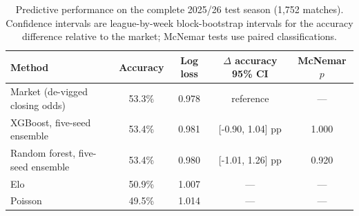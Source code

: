 \begin{table}[tbp]
\centering
\small
\setlength{\tabcolsep}{5pt}
\caption{Predictive performance on the complete 2025/26 test season (1,752 matches). Confidence intervals are league-by-week block-bootstrap intervals for the accuracy difference relative to the market; McNemar tests use paired classifications.}
\label{tab:predictive}
\begin{tabular}{lcccc}
\toprule
Method & Accuracy & Log loss & $\Delta$ accuracy 95\% CI & McNemar $p$ \\
\midrule
Market (de-vigged closing odds) & 53.3\% & 0.978 & reference & --- \\
XGBoost, five-seed ensemble & 53.4\% & 0.981 & [-0.90, 1.04] pp & 1.000 \\
Random forest, five-seed ensemble & 53.4\% & 0.980 & [-1.01, 1.26] pp & 0.920 \\
Elo & 50.9\% & 1.007 & --- & --- \\
Poisson & 49.5\% & 1.014 & --- & --- \\
\bottomrule
\end{tabular}
\end{table}
